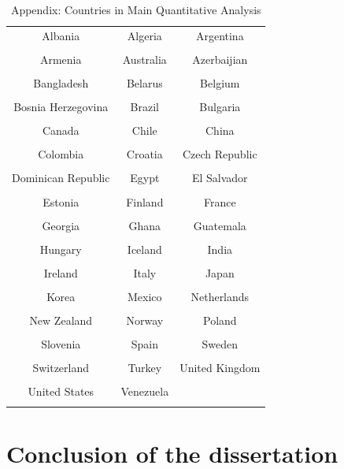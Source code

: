 \documentclass[12pt]{report}
\begin{document}
\begin{table}[htdp]
\caption{Appendix: Countries in Main Quantitative Analysis}
\begin{center}
\vspace{2em}
\begin{tabular}{ccc}
Albania & Algeria & Argentina \\ \\
Armenia & Australia & Azerbaijian \\ \\
Bangladesh & Belarus & Belgium \\ \\
Bosnia Herzegovina & Brazil & Bulgaria \\ \\
Canada & Chile & China \\ \\
Colombia & Croatia & Czech Republic \\ \\
Dominican Republic & Egypt & El Salvador \\ \\
Estonia & Finland & France \\ \\
Georgia & Ghana & Guatemala \\ \\
Hungary & Iceland & India \\ \\
Ireland & Italy & Japan \\ \\
Korea & Mexico & Netherlands \\ \\
New Zealand & Norway & Poland \\ \\
Slovenia & Spain & Sweden \\ \\
Switzerland & Turkey & United Kingdom \\ \\
United States & Venezuela \\ \\

\end{tabular}
\end{center}
\label{default}
\end{table}



\section{Conclusion of the dissertation}
\end{document}
